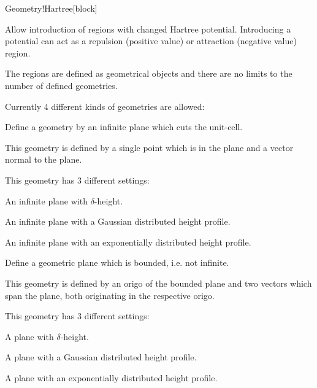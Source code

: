 \begin{fdfentry}{Geometry!Hartree}[block]%

  
  Allow introduction of regions with changed Hartree
  potential. Introducing a potential can act as a repulsion
  (positive value) or attraction (negative value) region.

  The regions are defined as geometrical objects and there are no
  limits to the number of defined geometries.

  Currently 4 different kinds of geometries are allowed:
  \begin{fdfoptions}
    


    Define a geometry by an infinite plane which cuts the unit-cell.

    This geometry is defined by a single point which is in the plane
    and a vector normal to the plane.

    This geometry has 3 different settings:
    \begin{fdfoptions}
      \option[delta] %
      An infinite plane with $\delta$-height.

      \option[gauss] %
      An infinite plane with a Gaussian distributed height profile.

      \option[exp] %
      An infinite plane with an exponentially distributed height
      profile.

    \end{fdfoptions}



    Define a geometric plane which is bounded, i.e. not infinite.

    This geometry is defined by an origo of the bounded plane and two
    vectors which span the plane, both originating in the respective
    origo.

    This geometry has 3 different settings:
    \begin{fdfoptions}

      \option[delta] %
      A plane with $\delta$-height.

      \option[gauss] %
      A plane with a Gaussian distributed height profile.

      \option[exp] %
      A plane with an exponentially distributed height profile.

    \end{fdfoptions}



\end{fdfoptions}
\end{fdfentry}
